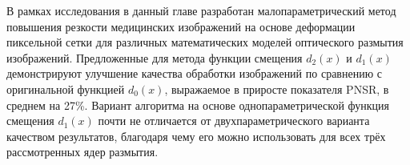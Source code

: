 В рамках исследования в данный главе разработан малопараметрический метод повышения резкости медицинских изображений на основе деформации пиксельной сетки для различных математических моделей оптического размытия изображений. 
Предложенные для метода функции смещения $d_2\left(x\right)$ и $d_1\left(x\right)$ демонстрируют улучшение качества обработки изображений по сравнению с оригинальной функцией $d_0\left(x\right)$, выражаемое в приросте показателя PNSR, в среднем на 27\%. Вариант алгоритма на основе однопараметрической функция смещения $d_1\left(x\right)$ почти не отличается от двухпараметрического варианта качеством результатов, благодаря чему его можно использовать для всех трёх рассмотренных ядер размытия.

\FloatBarrier
